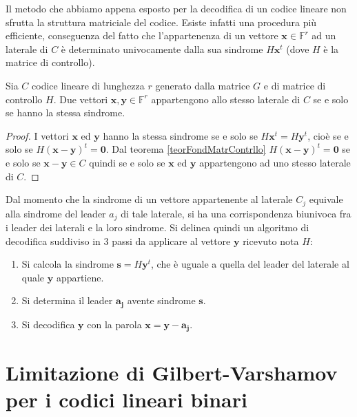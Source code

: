 Il metodo che abbiamo appena esposto per la decodifica di un codice lineare non sfrutta la struttura matriciale del codice. Esiste infatti una procedura più efficiente, conseguenza del fatto che l'appartenenza di un vettore $\mathbf{x} \in \mathbb{F}^{r}$ ad un laterale di $C$ è determinato univocamente dalla sua sindrome $H \mathbf{x}^{t}$ (dove $H$ è la matrice di controllo).
\begin{teorema}
   Sia $C$ codice lineare di lunghezza $r$ generato dalla matrice $G$ e di matrice di controllo $H$. Due vettori $\mathbf{x}, \mathbf{y} \in \mathbb{F}^{r}$ appartengono allo stesso laterale di $C$ se e solo se hanno la stessa sindrome.
\end{teorema}
\begin{proof}
   I vettori $\mathbf{x}$ ed $\mathbf{y}$ hanno la stessa sindrome se e solo se $H \mathbf{x}^{t} = H \mathbf{y}^{t}$, cioè se e solo se $H (\mathbf{x}-\mathbf{y})^{t} = \mathbf{0}$. Dal teorema \ref{teorFondMatrContrllo} $H (\mathbf{x}-\mathbf{y})^{t} = \mathbf{0}$ se e solo se $\mathbf{x}-\mathbf{y} \in C$ quindi se e solo se $\mathbf{x}$ ed $\mathbf{y}$ appartengono ad uno stesso laterale di $C$.
\end{proof}
\noindent
Dal momento che la sindrome di un vettore appartenente al laterale $C_{j}$ equivale alla sindrome del leader $a_{j}$ di tale laterale, si ha una corrispondenza biunivoca fra i leader dei laterali e la loro sindrome. Si delinea quindi un algoritmo di decodifica suddiviso in $3$ passi da applicare al vettore $\mathbf{y}$ ricevuto nota $H$:
\begin{enumerate}
   \item Si calcola la sindrome $\mathbf{s} = H \mathbf{y}^{t}$, che è uguale a quella del leader del laterale al quale $\mathbf{y}$ appartiene.
   \item Si determina il leader $\mathbf{a_{j}}$ avente sindrome $\mathbf{s}$.
   \item Si decodifica $\mathbf{y}$ con la parola $\mathbf{x} = \mathbf{y} - \mathbf{a_{j}}$.
\end{enumerate}

\section{Limitazione di Gilbert-Varshamov per i codici lineari binari}

